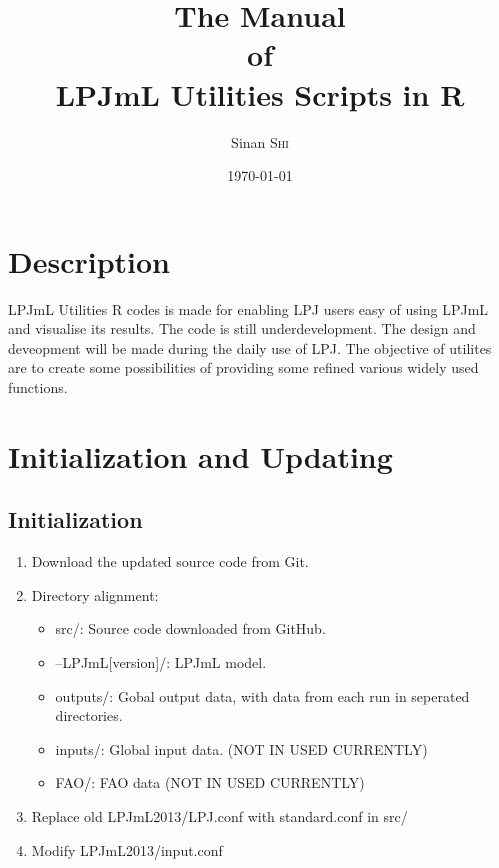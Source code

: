 \documentclass{article}
\title{The Manual\\of\\LPJmL Utilities Scripts in R} %
\author{Sinan \textsc{Shi}} %
\date{\today} %
\begin{document}
\maketitle %
\tableofcontents
\pagebreak

\section{Description}
LPJmL Utilities R codes is made for enabling LPJ users easy of using LPJmL and visualise its results.
The code is still underdevelopment. The design and deveopment will be made during the daily use of LPJ. The objective of utilites are to create some possibilities of providing 
some refined various widely used functions.

\pagebreak
\section{Initialization and Updating}
\subsection{Initialization}
\begin{enumerate}
\item Download the updated source code from Git.
\item Directory alignment:
   \begin{itemize}
   \item src/: Source code downloaded from GitHub.
   \item --LPJmL[version]/: LPJmL model.
   \item outputs/: Gobal output data, with data from each run in seperated directories. 
   \item inputs/: Global input data. (NOT IN USED CURRENTLY)
   \item FAO/: FAO data (NOT IN USED CURRENTLY)
   \end{itemize}
\item Replace old LPJmL2013/LPJ.conf with standard.conf in src/
\item Modify LPJmL2013/input.conf 
\end{enumerate}
\end{document}
